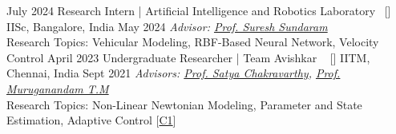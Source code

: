 \begin{experiences}
  \emptySeparator
   \researchexperience
    {July 2024}   {Research Intern | Artificial Intelligence and Robotics Laboratory{\normalfont  ~ [\href{https://www.linkedin.com/company/artificial-intelligence-and-robotics-laboratory/posts/?feedView=all}{\small{\websiteSymbol}}]
    }}{IISc, Bangalore, India}{}
    {May 2024} {\textit{ Advisor: \href{https://aero.iisc.ac.in/people/sureshsundaram/}{Prof. Suresh Sundaram}}\\
     Research Topics:  Vehicular Modeling, RBF-Based Neural Network, Velocity Control
    }
  \emptySeparator
    \researchexperience
    {April 2023}   {Undergraduate Researcher | Team Avishkar {\normalfont  ~ [\href{https://avishkarhyperloop.com}{\small{\websiteSymbol}}]
    }}{IITM, Chennai, India }{}
    {Sept 2021} {\textit{Advisors: \href{https://www.linkedin.com/in/satya-chakravarthy-51326241/?originalSubdomain=in}{Prof. Satya Chakravarthy}, \href{http://www.ae.iitm.ac.in/~murgi/murgi.html}{Prof. Muruganandam  T.M  } }\\
    Research Topics: Non-Linear Newtonian Modeling, Parameter and State Estimation, Adaptive Control [\hyperref[C1]{C1}]
    }

  
\end{experiences}
\vspace{-1mm}
